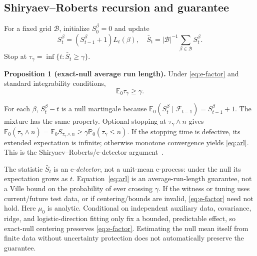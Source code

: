 \documentclass[letterpaper,journal]{IEEEtran}
\newcommand{\E}{\mathbb E}
\newcommand{\Prb}{\mathbb P}
\newcommand{\cF}{\mathcal F}
\begin{document}
\subsection{Shiryaev--Roberts recursion and guarantee}

For a fixed grid $\mathcal B$, initialize $S_0^\beta=0$ and update
\begin{equation}
S_t^\beta=(S_{t-1}^\beta+1)L_t(\beta),\quad
\bar S_t=|\mathcal B|^{-1}\sum_{\beta\in\mathcal B}S_t^\beta.
\label{eq:sr}
\end{equation}
Stop at $\tau_\gamma=\inf\{t:\bar S_t\geq\gamma\}$.

\textbf{Proposition 1 (exact-null average run length).}
Under \eqref{eq:e-factor} and standard integrability conditions,
\begin{equation}
\E_0\tau_\gamma\geq\gamma.
\label{eq:arl}
\end{equation}

\begin{IEEEproof}
For each $\beta$,
$S_t^\beta-t$ is a null martingale because
$\E_0(S_t^\beta\mid\cF_{t-1})=S_{t-1}^\beta+1$. The mixture has the same
property. Optional stopping at $\tau_\gamma\wedge n$ gives
$\E_0(\tau_\gamma\wedge n)=
\E_0\bar S_{\tau_\gamma\wedge n}\geq
\gamma\Prb_0(\tau_\gamma\leq n)$.
If the stopping time is defective, its extended expectation is infinite;
otherwise monotone convergence yields \eqref{eq:arl}. This is the
Shiryaev--Roberts/e-detector argument~\cite{shin2024}.
\end{IEEEproof}

The statistic $\bar S_t$ is an e-\emph{detector}, not a unit-mean e-process:
under the null its expectation grows as $t$. Equation~\eqref{eq:arl} is an
average-run-length guarantee, not a Ville bound on the probability of ever
crossing $\gamma$. If the witness or tuning uses current/future test data, or
if centering/bounds are invalid, \eqref{eq:e-factor} need not hold. Here
$\mu_0$ is analytic. Conditional on independent auxiliary data, covariance,
ridge, and logistic-direction fitting only fix a bounded, predictable effect,
so exact-null centering preserves \eqref{eq:e-factor}. Estimating the null mean
itself from finite data without uncertainty protection does not automatically
preserve the guarantee.
\end{document}
